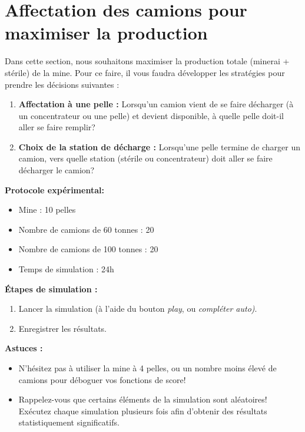  \section{Affectation des camions pour maximiser la production}
\label{sec:score}

Dans cette section, nous souhaitons maximiser la production totale (minerai + stérile) de la mine. Pour ce faire, il vous faudra développer les stratégies pour prendre les décisions suivantes : 

\begin{enumerate}
	\item \textbf{Affectation à une pelle : }Lorsqu'un camion vient de se faire décharger (à un concentrateur ou une pelle) et devient disponible, à quelle pelle doit-il aller se faire remplir?
	\item \textbf{Choix de la station de décharge : }Lorsqu'une pelle termine de charger un camion, vers quelle station (stérile ou concentrateur) doit aller se faire décharger le camion? 
\end{enumerate}



\vspace{10pt}
\noindent \textbf{\Large Protocole expérimental: }

\begin{itemize}
	\item Mine : 10 pelles
	\item Nombre de camions de 60 tonnes : 20
	\item Nombre de camions de 100 tonnes : 20
	\item Temps de simulation : 24h
\end{itemize}


\vspace{10pt}
\noindent \textbf{\large Étapes de simulation :  }
\begin{enumerate}
	\item Lancer la simulation (à l'aide du bouton \textit{play}, ou \textit{compléter auto)}.
	\item Enregistrer les résultats.
\end{enumerate}

\noindent\textbf{Astuces : }

\begin{itemize}
	\item N'hésitez pas à utiliser la mine à 4 pelles, ou un nombre moins élevé de camions pour déboguer vos fonctions de score!
	\item Rappelez-vous que certains éléments de la simulation sont aléatoires! Exécutez chaque simulation plusieurs fois afin d'obtenir des résultats statistiquement significatifs.
\end{itemize}



